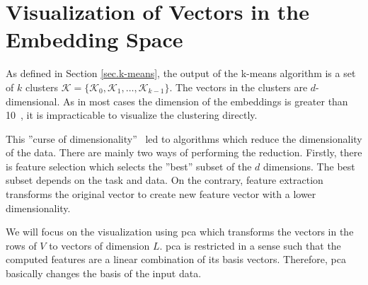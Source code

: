 \section{Visualization of Vectors in the Embedding Space}

As defined in Section \ref{sec.k-means}, the output of the k-means algorithm is a set of $k$ clusters $\mathcal{K}=\{\mathcal{K}_0, \mathcal{K}_1, \ldots, \mathcal{K}_{k-1}\}$. 
The vectors in the clusters are $d$-dimensional. 
As in most cases the dimension of the embeddings is greater than 10~\cite[p.~34]{Hershey2016}, it is impracticable to visualize the clustering directly.

This ''curse of dimensionality''~\cite{Keogh2017} led to algorithms which reduce the dimensionality of the data. There are mainly two ways of performing the reduction. Firstly, there is feature selection which selects the ''best'' subset of the $d$ dimensions. The best subset depends on the task and data.
On the contrary, feature extraction transforms the original vector to create new feature vector with a lower dimensionality.~\cite[p.~103]{Pudil1998}

We will focus on the visualization using \gls{pca} which transforms the vectors in the rows of $V$ to vectors of dimension $L$. \gls{pca} is restricted in a sense such that the computed features are a linear combination of its basis vectors. Therefore, \gls{pca} basically changes the basis of the input data.~\cite[p.~3]{Shlens2014}

